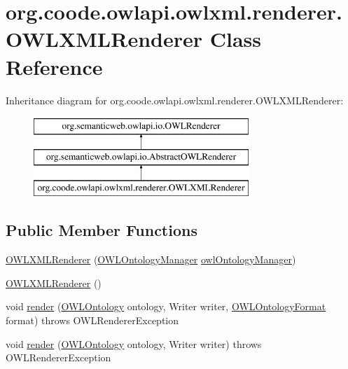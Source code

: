 \hypertarget{classorg_1_1coode_1_1owlapi_1_1owlxml_1_1renderer_1_1_o_w_l_x_m_l_renderer}{\section{org.\-coode.\-owlapi.\-owlxml.\-renderer.\-O\-W\-L\-X\-M\-L\-Renderer Class Reference}
\label{classorg_1_1coode_1_1owlapi_1_1owlxml_1_1renderer_1_1_o_w_l_x_m_l_renderer}
}
Inheritance diagram for org.\-coode.\-owlapi.\-owlxml.\-renderer.\-O\-W\-L\-X\-M\-L\-Renderer\-:\begin{figure}[H]
\begin{center}
\leavevmode
\includegraphics[height=3.000000cm]{classorg_1_1coode_1_1owlapi_1_1owlxml_1_1renderer_1_1_o_w_l_x_m_l_renderer}
\end{center}
\end{figure}
\subsection*{Public Member Functions}
\begin{DoxyCompactItemize}
\item 
\hyperlink{classorg_1_1coode_1_1owlapi_1_1owlxml_1_1renderer_1_1_o_w_l_x_m_l_renderer_a6bfc8fb954db8a651b433aff23e0c983}{O\-W\-L\-X\-M\-L\-Renderer} (\hyperlink{interfaceorg_1_1semanticweb_1_1owlapi_1_1model_1_1_o_w_l_ontology_manager}{O\-W\-L\-Ontology\-Manager} \hyperlink{classorg_1_1semanticweb_1_1owlapi_1_1io_1_1_abstract_o_w_l_renderer_abb9888586f19a7a923cba542d99f1556}{owl\-Ontology\-Manager})
\item 
\hyperlink{classorg_1_1coode_1_1owlapi_1_1owlxml_1_1renderer_1_1_o_w_l_x_m_l_renderer_a0117abda1c6583d8eb43b32fbd110362}{O\-W\-L\-X\-M\-L\-Renderer} ()
\item 
void \hyperlink{classorg_1_1coode_1_1owlapi_1_1owlxml_1_1renderer_1_1_o_w_l_x_m_l_renderer_a97c5af30871faf29dfeb08aa793cfe33}{render} (\hyperlink{interfaceorg_1_1semanticweb_1_1owlapi_1_1model_1_1_o_w_l_ontology}{O\-W\-L\-Ontology} ontology, Writer writer, \hyperlink{classorg_1_1semanticweb_1_1owlapi_1_1model_1_1_o_w_l_ontology_format}{O\-W\-L\-Ontology\-Format} format)  throws O\-W\-L\-Renderer\-Exception 
\item 
void \hyperlink{classorg_1_1coode_1_1owlapi_1_1owlxml_1_1renderer_1_1_o_w_l_x_m_l_renderer_a0eb563bc74c25c75e508993178298312}{render} (\hyperlink{interfaceorg_1_1semanticweb_1_1owlapi_1_1model_1_1_o_w_l_ontology}{O\-W\-L\-Ontology} ontology, Writer writer)  throws O\-W\-L\-Renderer\-Exception 
\end{DoxyCompactItemize}

